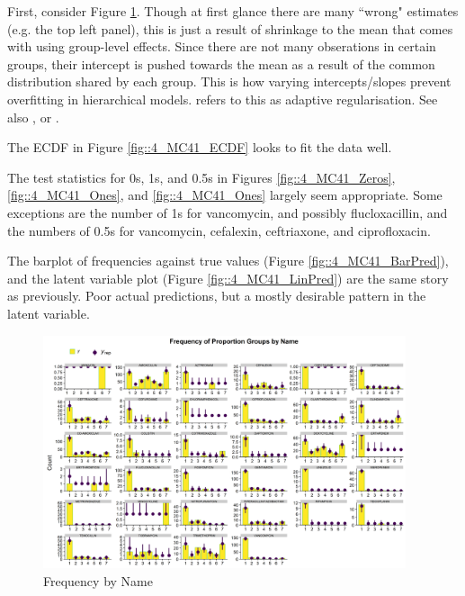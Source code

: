 \documentclass[11pt,twoside]{article}
\numberwithin{Theorem}{section}
\numberwithin{Definition}{section}
\numberwithin{Lemma}{section}
\numberwithin{Algorithm}{section}
\numberwithin{equation}{section}
\begin{document}
First, consider Figure \ref{fig::4_MC41_BarClass}. Though at first glance there are many ``wrong" estimates (e.g. the top left panel), this is just a result of shrinkage to the mean that comes with using group-level effects. Since there are not many obserations in certain groups, their intercept is pushed towards the mean as a result of the common distribution shared by each group. This is how varying intercepts/slopes prevent overfitting in hierarchical models. \cite{McElreath_book} refers to this as adaptive regularisation. See also \cite{GelmanBDA2013}, or \cite{GelmanHill2007}. 

The ECDF in Figure \ref{fig::4_MC41_ECDF} looks to fit the data well. 

The test statistics for 0s, 1s, and 0.5s in Figures \ref{fig::4_MC41_Zeros}, \ref{fig::4_MC41_Ones}, and \ref{fig::4_MC41_Ones} largely seem appropriate. Some exceptions are the number of 1s for vancomycin, and possibly flucloxacillin, and the numbers of 0.5s for vancomycin, cefalexin, ceftriaxone, and ciprofloxacin. 

The barplot of frequencies against true values (Figure \ref{fig::4_MC41_BarPred}), and the latent variable plot (Figure \ref{fig::4_MC41_LinPred}) are the same story as previously. Poor actual predictions, but a mostly desirable pattern in the latent variable. 

\begin{figure}[h!]
	\centering
	\includegraphics[width = 0.95\textwidth, height = 0.60\textheight]{Figures/4_MC41_BarClass.png}
	\caption{Frequency by Name} \label{fig::4_MC41_BarClass}	
\end{figure}

\newpage
\end{document}
